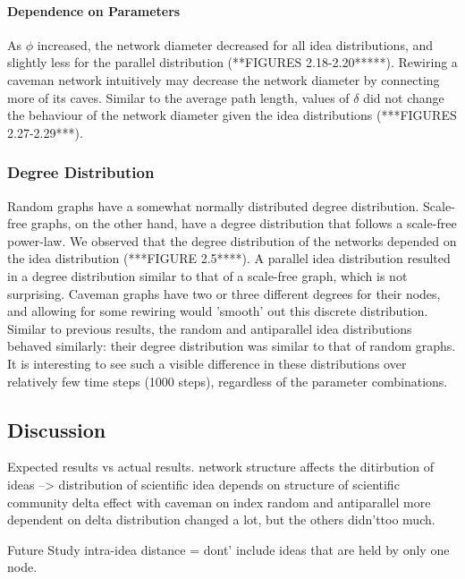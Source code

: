 \paragraph{Dependence on Parameters}
As $\phi$ increased, the network diameter decreased for all idea distributions, and slightly less for the parallel distribution (**FIGURES 2.18-2.20*****). Rewiring a caveman network intuitively may decrease the network diameter by connecting more of its caves.
Similar to the average path length, values of $\delta$ did not change the behaviour of the network diameter given the idea distributions (***FIGURES 2.27-2.29***).


\subsubsection{Degree Distribution}
Random graphs have a somewhat normally distributed degree distribution. Scale-free graphs, on the other hand, have a degree distribution that follows a scale-free power-law. We observed that the degree distribution of the networks depended on the idea distribution (***FIGURE 2.5****). A parallel idea distribution resulted in a degree distribution similar to that of a scale-free graph, which is not surprising. Caveman graphs have two or three different degrees for their nodes, and allowing for some rewiring would 'smooth' out this discrete distribution. Similar to previous results, the random and antiparallel idea distributions behaved similarly: their degree distribution was similar to that of random graphs. It is interesting to see such a visible difference in these distributions over relatively few time steps (1000 steps), regardless of the parameter combinations. 


\subsection{Discussion}


Expected results vs actual results.
network structure affects the ditirbution of ideas --> distribution of scientific idea depends on structure of scientific community
delta effect with caveman on index
random and antiparallel more dependent on delta
distribution changed a lot, but the others didn'ttoo much.



Future Study
intra-idea distance = dont' include ideas that are held by only one node.